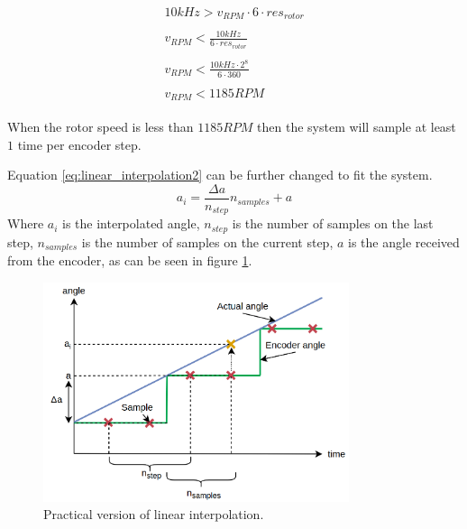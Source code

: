 \begin{subequations}
	\begin{align}
    	\begin{split}
        	10kHz > v_{RPM}\cdot 6 \cdot res_{rotor}
    	\end{split} \\ 
    	\begin{split}
        	v_{RPM} < \frac{10kHz}{6 \cdot res_{rotor}}
    	\end{split} \\
    	\begin{split}
        	v_{RPM} < \frac{10kHz \cdot 2^8}{6 \cdot 360}
    	\end{split} \\
    	\begin{split}
        	v_{RPM} < 1185 RPM
    	\end{split} 
	\end{align}
\end{subequations}

When the rotor speed is less than $1185RPM$ then the system will sample at least $1$ time per encoder step.

Equation \ref{eq:linear_interpolation2} can be further changed to fit the system.
\begin{equation}
    a_{i} = \frac{\Delta a}{n_{step}} n_{samples} + a
    \label{eq:linear_interpolation3}
\end{equation}
Where $a_{i}$ is the interpolated angle, $n_{step}$ is the number of samples on the last step, $n_{samples}$ is the number of samples on the current step, $a$ is the angle received from the encoder, as can be seen in figure \ref{fig:angle_interpolation2}.

\begin{figure}[H]
	\centering
	\includegraphics[width=0.8\textwidth]{pictures/software/angle_interpolation2.png}
	\caption{Practical version of linear interpolation.}
	\label{fig:angle_interpolation2}
\end{figure}






